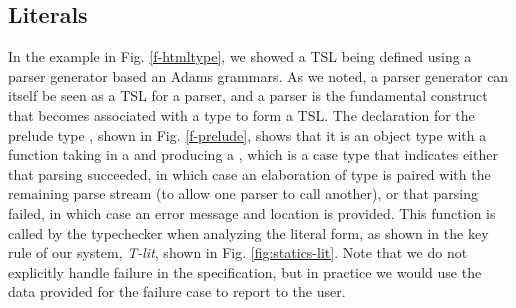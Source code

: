 %

\subsection{Literals}

In the example in Fig. \ref{f-htmltype}, we showed a TSL being defined using a parser generator based an Adams grammars. As we noted, a parser generator can itself be seen as a TSL for a parser, and a parser is the fundamental construct that becomes associated with a type to form a TSL. The declaration for the prelude type , shown in Fig. \ref{f-prelude}, shows that it is an object type with a  function taking in a  and producing a , which is a case type that indicates either that parsing succeeded, in which case an elaboration of type  is paired with the remaining parse stream (to allow one parser to call another), or that parsing failed, in which case an error message and location is provided. This function is called by the typechecker when analyzing the literal form, as shown in the key rule of our system, \textit{T-lit}, shown in Fig. \ref{fig:statics-lit}. Note that we do not explicitly handle failure in the specification, but in practice we would use the data provided for the failure case to report to the user. 

